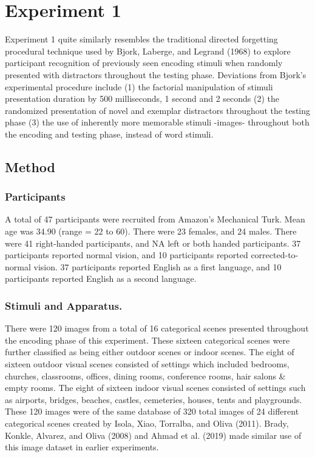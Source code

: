 \documentclass[
  english,
  man,floatsintext]{apa6}
\begin{document}
\hypertarget{experiment-1}{%
\section{Experiment 1}\label{experiment-1}}

Experiment 1 quite similarly resembles the traditional directed forgetting procedural technique used by Bjork, Laberge, and Legrand (1968) to explore participant recognition of previously seen encoding stimuli when randomly presented with distractors throughout the testing phase. Deviations from Bjork's experimental procedure include (1) the factorial manipulation of stimuli presentation duration by 500 milliseconds, 1 second and 2 seconds (2) the randomized presentation of novel and exemplar distractors throughout the testing phase (3) the use of inherently more memorable stimuli -images- throughout both the encoding and testing phase, instead of word stimuli.

\hypertarget{method}{%
\subsection{Method}\label{method}}

\hypertarget{participants}{%
\subsubsection{Participants}\label{participants}}

A total of 47 participants were recruited from Amazon's Mechanical Turk. Mean age was 34.90 (range = 22 to 60). There were 23 females, and 24 males. There were 41 right-handed participants, and NA left or both handed participants. 37 participants reported normal vision, and 10 participants reported corrected-to-normal vision. 37 participants reported English as a first language, and 10 participants reported English as a second language.

\hypertarget{stimuli-and-apparatus.}{%
\subsubsection{Stimuli and Apparatus.}\label{stimuli-and-apparatus.}}

There were 120 images from a total of 16 categorical scenes presented throughout the encoding phase of this experiment. These sixteen categorical scenes were further classified as being either outdoor scenes or indoor scenes. The eight of sixteen outdoor visual scenes consisted of settings which included bedrooms, churches, classrooms, offices, dining rooms, conference rooms, hair salons \& empty rooms. The eight of sixteen indoor visual scenes consisted of settings such as airports, bridges, beaches, castles, cemeteries, houses, tents and playgrounds. These 120 images were of the same database of 320 total images of 24 different categorical scenes created by Isola, Xiao, Torralba, and Oliva (2011). Brady, Konkle, Alvarez, and Oliva (2008) and Ahmad et al. (2019) made similar use of this image dataset in earlier experiments.
\end{document}
